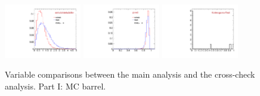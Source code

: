 \begin{figure}
  \includegraphics[width=0.3\textwidth]{Figures/VariablesComparison/MC_barrel_figs/pvips}
  \includegraphics[width=0.3\textwidth]{Figures/VariablesComparison/MC_barrel_figs/pvw8}
  \includegraphics[width=0.3\textwidth]{Figures/VariablesComparison/MC_barrel_figs/KS}
  \caption{Variable comparisons between the main analysis and the cross-check analysis. Part I: MC barrel.}
  \label{fig:MC_barrel_figs}
\end{figure}

